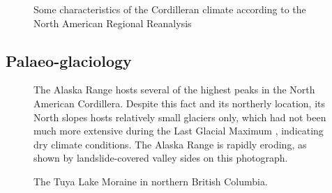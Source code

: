 \documentclass{article}
\begin{document}
\begin{figure}
  \centering
  \caption{Some characteristics of the Cordilleran climate according to the
           North American Regional Reanalysis
           \citep[NARR,][]{Mesinger.etal.2006}}
  \label{fig:plot-atm}
\end{figure}

\subsection{Palaeo-glaciology}

\begin{figure}
  \centering
  \caption{The Alaska Range hosts several of the highest peaks in the North
           American Cordillera. Despite this fact and its northerly location,
           its North slopes hosts relatively small glaciers only, which had not
           been much more extensive during the Last Glacial Maximum
           \citep{Kaufman.Manley.2004}, indicating dry climate conditions.
           The Alaska Range is rapidly eroding, as shown by landslide-covered
           valley sides on this photograph.}
  \label{fig:photo-alaska-range}
\end{figure}

\begin{figure}
  \centering
  \caption{The Tuya Lake Moraine in northern British Columbia.}
  \label{fig:photo-tuya-moraine}
\end{figure}
\end{document}
